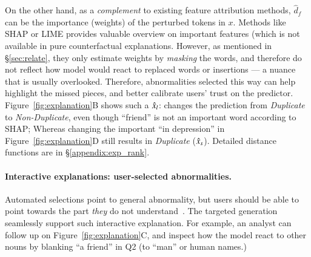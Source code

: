 On the other hand, as a \emph{complement} to existing feature attribution methods, $\hat{d}_f$ can be the importance (weights) of the perturbed tokens in $x$.
Methods like SHAP or LIME provides valuable overview on important features (which is not available in pure counterfactual explanations.
However, as mentioned in \S\ref{sec:relate}, they only estimate weights by \emph{masking} the words, and therefore do not reflect how model would react to replaced words or insertions --- a nuance that is usually overlooked.
Therefore, abnormalities selected this way can help highlight the missed pieces, and better calibrate users' trust on the predictor. 
Figure~\ref{fig:explanation}B shows such a $\hat{x}_l$:  changes the prediction from \emph{Duplicate} to \emph{Non-Duplicate}, even though ``friend'' is not an important word according to SHAP; Whereas changing the important ``in depression'' in Figure~\ref{fig:explanation}D still results in \emph{Duplicate} ($\hat{x}_s$).
Detailed distance functions are in \S\ref{appendix:exp_rank}.


\paragraph{Interactive explanations: user-selected abnormalities.}
Automated selections point to general abnormality, but users should be able to point towards the part \emph{they} do not understand~\cite{miller}.
The targeted generation seamlessly support such interactive explanation.
For example, an analyst can follow up on Figure~\ref{fig:explanation}C, and inspect how the model react to other nouns by blanking ``a friend'' in Q2 (\eg to ``man'' or human names.)


